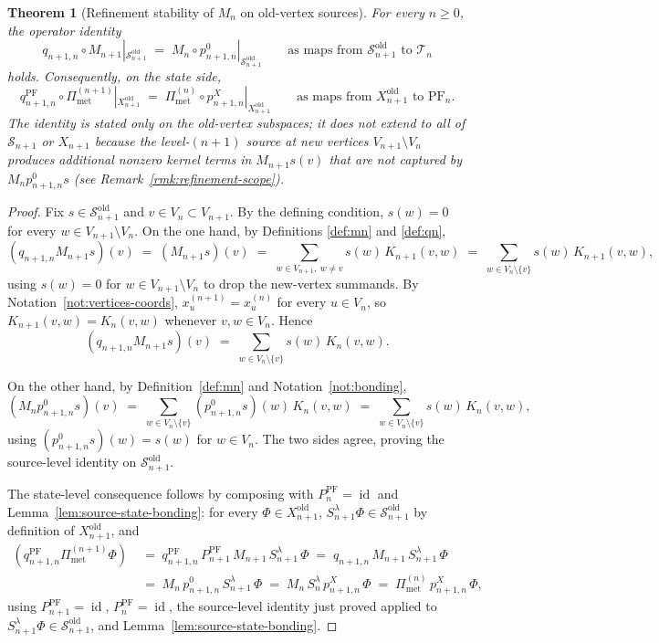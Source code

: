 \documentclass[11pt, a4paper]{amsart}
\newtheorem{theorem}{Theorem}[section]
\theoremstyle{definition}
\newcommand{\id}{\operatorname{id}}
\newcommand{\Met}{\mathrm{met}}
\newcommand{\PF}{\mathrm{PF}}
\newcommand{\Pimet}{\Pi_{\Met}}
\begin{document}
\begin{theorem}[Refinement stability of $M_n$ on old-vertex sources]
\label{thm:mn-refinement}
For every $n \geq 0$, the operator identity
\[
  q_{n+1, n} \circ M_{n+1}|_{\mathcal S_{n+1}^{\mathrm{old}}}
    \;=\; M_n \circ p_{n+1, n}^0|_{\mathcal S_{n+1}^{\mathrm{old}}}
  \qquad \text{as maps from }
    \mathcal S_{n+1}^{\mathrm{old}} \text{ to } \mathcal T_n
\]
holds. Consequently, on the state side,
\[
  q_{n+1, n}^\PF \circ
    \Pimet^{(n+1)}|_{X_{n+1}^{\mathrm{old}}}
    \;=\; \Pimet^{(n)} \circ
       p_{n+1, n}^X|_{X_{n+1}^{\mathrm{old}}}
  \qquad \text{as maps from }
    X_{n+1}^{\mathrm{old}} \text{ to } \PF_n.
\]
The identity is stated only on the old-vertex subspaces; it does
not extend to all of $\mathcal S_{n+1}$ or $X_{n+1}$ because the
level-$(n+1)$ source at new vertices $V_{n+1}\setminus V_n$
produces additional nonzero kernel terms in $M_{n+1}s(v)$ that are
not captured by $M_n p_{n+1, n}^0 s$ (see
Remark~\ref{rmk:refinement-scope}).
\end{theorem}

\begin{proof}
Fix $s \in \mathcal S_{n+1}^{\mathrm{old}}$ and $v \in V_n
\subset V_{n+1}$. By the defining condition, $s(w) = 0$ for every
$w \in V_{n+1}\setminus V_n$. On the one hand, by Definitions
\ref{def:mn} and \ref{def:qn},
\[
  (q_{n+1, n} M_{n+1} s)(v)
    \;=\; (M_{n+1} s)(v)
    \;=\; \sum_{w \in V_{n+1},\ w \neq v} s(w)\,K_{n+1}(v, w)
    \;=\; \sum_{w \in V_n\setminus\{v\}} s(w)\,K_{n+1}(v, w),
\]
using $s(w) = 0$ for $w \in V_{n+1}\setminus V_n$ to drop the
new-vertex summands. By Notation~\ref{not:vertices-coords},
$x_u^{(n+1)} = x_u^{(n)}$ for every $u \in V_n$, so
$K_{n+1}(v, w) = K_n(v, w)$ whenever $v, w \in V_n$. Hence
\[
  (q_{n+1, n} M_{n+1} s)(v)
    \;=\; \sum_{w \in V_n\setminus\{v\}} s(w)\,K_n(v, w).
\]

On the other hand, by Definition~\ref{def:mn} and
Notation~\ref{not:bonding},
\[
  (M_n p_{n+1, n}^0 s)(v)
    \;=\; \sum_{w \in V_n\setminus\{v\}}
       (p_{n+1, n}^0 s)(w)\,K_n(v, w)
    \;=\; \sum_{w \in V_n\setminus\{v\}} s(w)\,K_n(v, w),
\]
using $(p_{n+1, n}^0 s)(w) = s(w)$ for $w \in V_n$. The two sides
agree, proving the source-level identity on
$\mathcal S_{n+1}^{\mathrm{old}}$.

The state-level consequence follows by composing with
$P_n^\PF = \id$ and
Lemma~\ref{lem:source-state-bonding}: for every
$\Phi \in X_{n+1}^{\mathrm{old}}$,
$S_{n+1}^\lambda \Phi \in \mathcal S_{n+1}^{\mathrm{old}}$ by
definition of $X_{n+1}^{\mathrm{old}}$, and
\begin{align*}
  (q_{n+1, n}^\PF \Pimet^{(n+1)} \Phi)
    &\;=\; q_{n+1, n}^\PF\,P_{n+1}^\PF\,M_{n+1}\,S_{n+1}^\lambda
       \,\Phi
     \;=\; q_{n+1, n}\,M_{n+1}\,S_{n+1}^\lambda\,\Phi \\
    &\;=\; M_n\,p_{n+1, n}^0\,S_{n+1}^\lambda\,\Phi
     \;=\; M_n\,S_n^\lambda\,p_{n+1, n}^X\,\Phi
     \;=\; \Pimet^{(n)}\,p_{n+1, n}^X\,\Phi,
\end{align*}
using $P_{n+1}^\PF = \id$, $P_n^\PF = \id$, the source-level
identity just proved applied to
$S_{n+1}^\lambda \Phi \in \mathcal S_{n+1}^{\mathrm{old}}$, and
Lemma~\ref{lem:source-state-bonding}.
\end{proof}
\end{document}
